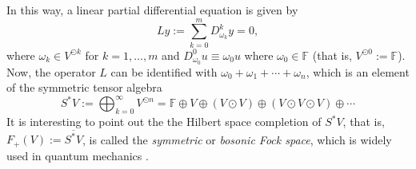 \documentclass[a4paper,12pt,onecolumn]{article}
\theoremstyle{ptheorem}
\theoremstyle{hdef}
\theoremstyle{premark}
\numberwithin{equation}{section}
\numberwithin{figure}{section}
\newcommand{\bF}{{\mathbb F}}
\newcommand{\<}{\langle}
\renewcommand{\>}{\rangle}
\newcommand{\ol}{\overline}
\renewcommand{\<}{\left<}
\renewcommand{\>}{\right>}
\renewcommand{\(}{\left(}
\renewcommand{\)}{\right)}
\begin{document}
In this way, a linear partial differential equation is given by
\begin{equation}Ly:=\sum_{k=0}^mD^k_{\omega_k}y=0,\label{lineq}\end{equation}
where $\omega_k\in V^{\odot k}$ for $k=1,\dots,m$ and $D^0_{\omega_0}u\equiv\omega_0 u$ where $\omega_0\in\bF$ (that is, $V^{\odot 0}:=\bF$). Now, the operator $L$ can be identified with $\omega_0+ \omega_1+\cdots+ \omega_n$, which is an element of the  symmetric tensor algebra
\[ S^*V:=\bigoplus_{k=0}^{\infty}V^{\odot n} =\mathbb{F} \oplus V \oplus \left(V\odot V\right) \oplus \left(V\odot V\odot V\right) \oplus \cdots\]
It is interesting to point out the the Hilbert space completion of $S^*V$, that is, $F_+(V):=\ol{S^*V}$, is called the \emph{symmetric} or \emph{bosonic Fock space}, which is widely used in quantum mechanics \cite{Fock}.
\end{document}
